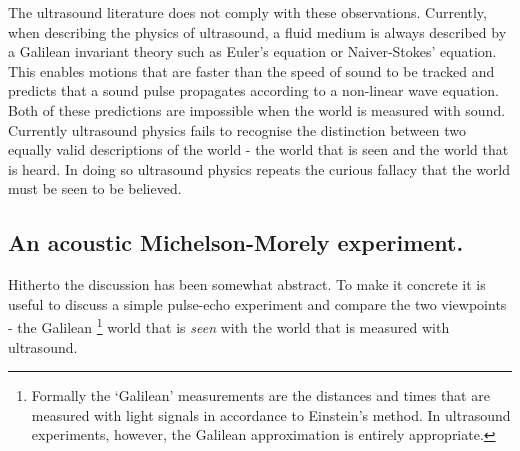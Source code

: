 \documentclass[10pt, fleqn,final,showtrims,oldfontcommands]{article} %
\newcommand{\secref}[1]{section~\ref{sec:#1}}
\begin{document}
The ultrasound literature does not comply with these observations.
Currently, when describing the physics of ultrasound, a fluid medium is always described by a Galilean invariant theory such as Euler's equation or Naiver-Stokes' equation.
This enables motions that are faster than the speed of sound to be tracked 
and predicts that  a sound pulse  propagates according to  a non-linear wave equation.
Both of these predictions are impossible when the world is measured with sound.
%
Currently ultrasound physics fails to recognise the distinction between  two equally valid descriptions of the world -
the world that is seen
and the world that is heard.
In doing so ultrasound physics repeats the curious  fallacy that  the world must be seen to be believed.

\subsection{An acoustic Michelson-Morely  experiment.}

Hitherto the discussion has been somewhat abstract.
To make it concrete it is useful to discuss a simple pulse-echo experiment and  compare the two viewpoints
- the Galilean%
\footnote{Formally the `Galilean' measurements are the distances and times that are  measured with light signals in accordance to Einstein's method.
In ultrasound experiments, however, the Galilean approximation is entirely appropriate.}
 world that is {\em seen} 
with the world that is measured with ultrasound. %
%

\end{document}
